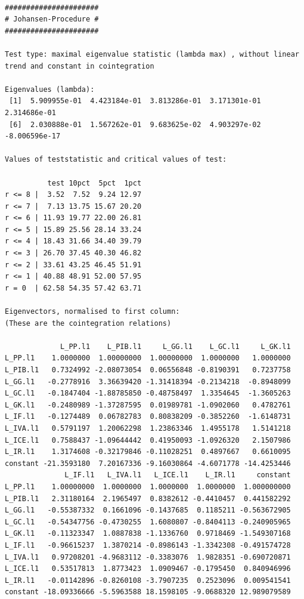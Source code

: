 \documentclass[
  spanish,
  letterpaper,
  DIV=11,
  numbers=noendperiod]{scrartcl}
\begin{document}
\begin{verbatim}

###################### 
# Johansen-Procedure # 
###################### 

Test type: maximal eigenvalue statistic (lambda max) , without linear trend and constant in cointegration 

Eigenvalues (lambda):
 [1]  5.909955e-01  4.423184e-01  3.813286e-01  3.171301e-01  2.314686e-01
 [6]  2.030888e-01  1.567262e-01  9.683625e-02  4.903297e-02 -8.006596e-17

Values of teststatistic and critical values of test:

          test 10pct  5pct  1pct
r <= 8 |  3.52  7.52  9.24 12.97
r <= 7 |  7.13 13.75 15.67 20.20
r <= 6 | 11.93 19.77 22.00 26.81
r <= 5 | 15.89 25.56 28.14 33.24
r <= 4 | 18.43 31.66 34.40 39.79
r <= 3 | 26.70 37.45 40.30 46.82
r <= 2 | 33.61 43.25 46.45 51.91
r <= 1 | 40.88 48.91 52.00 57.95
r = 0  | 62.58 54.35 57.42 63.71

Eigenvectors, normalised to first column:
(These are the cointegration relations)

             L_PP.l1    L_PIB.l1     L_GG.l1    L_GC.l1     L_GK.l1
L_PP.l1    1.0000000  1.00000000  1.00000000  1.0000000   1.0000000
L_PIB.l1   0.7324992 -2.08073054  0.06556848 -0.8190391   0.7237758
L_GG.l1   -0.2778916  3.36639420 -1.31418394 -0.2134218  -0.8948099
L_GC.l1   -0.1847404 -1.88785850 -0.48758497  1.3354645  -1.3605263
L_GK.l1   -0.2480989 -1.37287595  0.01989781 -1.0902060   0.4782761
L_IF.l1   -0.1274489  0.06782783  0.80838209 -0.3852260  -1.6148731
L_IVA.l1   0.5791197  1.20062298  1.23863346  1.4955178   1.5141218
L_ICE.l1   0.7588437 -1.09644442  0.41950093 -1.0926320   2.1507986
L_IR.l1    1.3174608 -0.32179846 -0.11028251  0.4897667   0.6610095
constant -21.3593180  7.20167336 -9.16030864 -4.6071778 -14.4253446
              L_IF.l1   L_IVA.l1   L_ICE.l1    L_IR.l1     constant
L_PP.l1    1.00000000  1.0000000  1.0000000  1.0000000  1.000000000
L_PIB.l1   2.31180164  2.1965497  0.8382612 -0.4410457  0.441582292
L_GG.l1   -0.55387332  0.1661096 -0.1437685  0.1185211 -0.563672905
L_GC.l1   -0.54347756 -0.4730255  1.6080807 -0.8404113 -0.240905965
L_GK.l1   -0.11323347  1.0887838 -1.1336760  0.9718469 -1.549307168
L_IF.l1   -0.96615237  1.3870214 -0.8986143 -1.3342308 -0.491574728
L_IVA.l1   0.97208201 -4.9683112 -0.3383076  1.9828351 -0.690720871
L_ICE.l1   0.53517813  1.8773423  1.0909467 -0.1795450  0.840946996
L_IR.l1   -0.01142896 -0.8260108 -3.7907235  0.2523096  0.009541541
constant -18.09336666 -5.5963588 18.1598105 -9.0688320 12.989079589


\end{verbatim}
\end{document}
